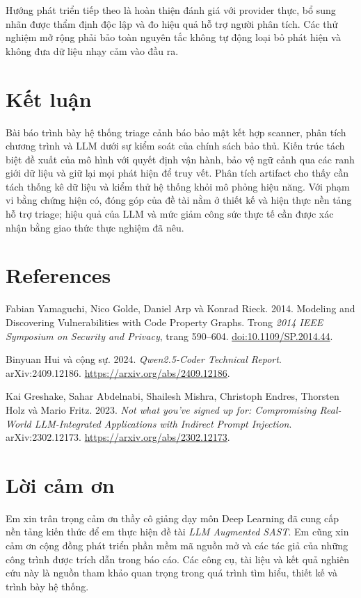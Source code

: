 \documentclass[11pt,a4paper]{article}
\makeatletter
\renewenvironment{thebibliography}[1]{%
  \section*{References}%
  \phantomsection
  \addcontentsline{toc}{section}{References}%
  \small
  \list{\@biblabel{\the\c@NAT@ctr}}{\@bibsetup{#1}\global\c@NAT@ctr\z@}%
  \let\p@NAT@ctr\@empty
  \renewcommand\theNAT@ctr{\arabic{NAT@ctr}}%
  \sloppy\clubpenalty4000\widowpenalty4000
}{\endlist}
\makeatother
\begin{document}
Hướng phát triển tiếp theo là hoàn thiện đánh giá với provider thực, bổ sung nhãn được thẩm định độc lập và đo hiệu quả hỗ trợ người phân tích. Các thử nghiệm mở rộng phải bảo toàn nguyên tắc không tự động loại bỏ phát hiện và không đưa dữ liệu nhạy cảm vào đầu ra.

\section{Kết luận}
Bài báo trình bày hệ thống triage cảnh báo bảo mật kết hợp scanner, phân tích chương trình và LLM dưới sự kiểm soát của chính sách bảo thủ. Kiến trúc tách biệt đề xuất của mô hình với quyết định vận hành, bảo vệ ngữ cảnh qua các ranh giới dữ liệu và giữ lại mọi phát hiện để truy vết. Phân tích artifact cho thấy cần tách thống kê dữ liệu và kiểm thử hệ thống khỏi mô phỏng hiệu năng. Với phạm vi bằng chứng hiện có, đóng góp của đề tài nằm ở thiết kế và hiện thực nền tảng hỗ trợ triage; hiệu quả của LLM và mức giảm công sức thực tế cần được xác nhận bằng giao thức thực nghiệm đã nêu.

\begin{thebibliography}{9}
Fabian Yamaguchi, Nico Golde, Daniel Arp và Konrad Rieck.
2014. Modeling and Discovering Vulnerabilities with Code Property Graphs.
Trong \textit{2014 IEEE Symposium on Security and Privacy}, trang 590--604.
\href{https://doi.org/10.1109/SP.2014.44}{doi:10.1109/SP.2014.44}.

Binyuan Hui và cộng sự.
2024. \textit{Qwen2.5-Coder Technical Report}.
arXiv:2409.12186.
\url{https://arxiv.org/abs/2409.12186}.

Kai Greshake, Sahar Abdelnabi, Shailesh Mishra, Christoph Endres,
Thorsten Holz và Mario Fritz.
2023. \textit{Not what you've signed up for: Compromising Real-World
LLM-Integrated Applications with Indirect Prompt Injection}.
arXiv:2302.12173.
\url{https://arxiv.org/abs/2302.12173}.
\end{thebibliography}
\clearpage

\section*{Lời cảm ơn}
Em xin trân trọng cảm ơn thầy cô giảng dạy môn Deep Learning đã cung cấp nền tảng kiến thức để em thực hiện đề tài \textit{LLM Augmented SAST}. Em cũng xin cảm ơn cộng đồng phát triển phần mềm mã nguồn mở và các tác giả của những công trình được trích dẫn trong báo cáo. Các công cụ, tài liệu và kết quả nghiên cứu này là nguồn tham khảo quan trọng trong quá trình tìm hiểu, thiết kế và trình bày hệ thống.
\end{document}
